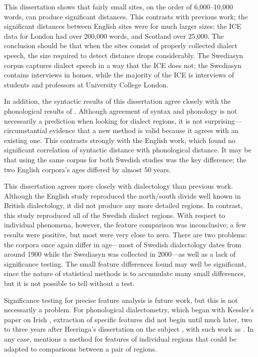 This dissertation shows that fairly small sites, on the order of
6,000--10,000 words, can produce significant distances. This contrasts
with previous work; the significant distances between English sites
were for much larger sizes: the ICE data for London had over 200,000
words, and Scotland over 25,000. The conclusion should be that when
the sites consist of properly collected dialect speech, the size
required to detect distance drops considerably. The Swediasyn corpus
captures dialect speech in a way that the ICE does not; the Swediasyn
contains interviews in homes, while the majority of the ICE is
interviews of students and professors at University College London.

In addition, the syntactic results of this dissertation agree closely
with the phonological results of . Although
agreement of syntax and phonology is not necessarily a prediction when
looking for dialect regions, it is not surprising---circumstantial
evidence that a new method is valid because it agrees with an existing
one. This contrasts strongly with the English work, which found no
significant correlation of syntactic distance with phonological
distance. It may be that using the same corpus for both Swedish
studies was the key difference; the two English corpora's ages differed by
almost 50 years.

This dissertation agrees more closely with dialectology than previous
work. Although the English study reproduced the north/south divide
well known in British dialectology, it did not produce any more
detailed regions. In contrast, this study reproduced all of the
Swedish dialect regions. With respect to individual phenomena,
however, the feature comparison was inconclusive; a few results were
positive, but most were very close to zero. There are two problems: the
corpora once again differ in age---most of Swedish dialectology dates
from around 1900 while the Swediasyn was collected in 2000---as well as a
lack of significance testing. The small feature differences found
may well be significant, since the nature of statistical
methods is to accumulate many small differences, but it is not
possible to tell without a test.

Significance testing for precise feature analysis is future work, but
this is not necessarily a problem. For phonological dialectometry,
which began with Kessler's paper on Irish \cite{kessler95}, extraction
of specific features did not begin until much later, two to three
years after Heeringa's dissertation on the subject \cite{heeringa04},
with such work as .
In any case,  mentions a method for features of
individual regions that could be adapted to comparisons between a pair
of regions.

